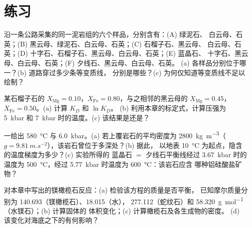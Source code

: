 \section{练习}

\begin{exercise}[$\star$]\label{exo:b2:pt-paths:1}
沿一条公路采集的同一泥岩组的六个样品，分别含有：(A) 绿泥石、
白云母、石英；(B) 黑云母、绿泥石、白云母、石英；(C) 石榴子石、黑云母、
白云母、石英；(D) 十字石、石榴子石、黑云母、白云母、石英；(E) 蓝晶石、
十字石、黑云母、白云母、石英；(F) 夕线石、黑云母、白云母、石英。
(a) 各样品分别位于哪一？(b) 道路穿过多少条等变质线，
分别是哪些？(c) 为何仅知道等变质线不足以
绘制？
\end{exercise}

\begin{exercise}[$\star$]\label{exo:b2:pt-paths:2}
某石榴子石的 $X_{\text{Mg}} = 0.10$，$X_{\text{Fe}} = 0.80$，与之相邻的黑云母的
$X_{\text{Mg}} = 0.45$，$X_{\text{Fe}} = 0.50$。(a) 计算 $K_D$ 和 $\ln K_D$。
(b) 利用本章的标定式，计算压强为 \qty{5}{kbar} 和
\qty{7}{kbar} 时的温度。(c) 该结果是还是？
\end{exercise}

\begin{exercise}[$\star$]\label{exo:b2:pt-paths:3}
一给出 \qty{580}{\celsius} 与 \qty{6.0}{kbar}。(a) 若上覆岩石的平均密度为
\qty{2800}{kg.m^{-3}}（$g = \qty{9.81}{m.s^{-2}}$），该岩石曾位于多深处？(b) 据此，
以地表 \qty{10}{\celsius} 为起点，隐含的温度梯度为多少？(c) 实验所得的
蓝晶石 $=$ 夕线石平衡线经过 \qty{3.67}{kbar} 时的温度为
\qty{500}{\celsius}，经过 \qty{5.77}{kbar} 时温度为 \qty{600}{\celsius}：该岩石应含
哪种铝硅酸盐矿物？
\end{exercise}

\begin{exercise}[$\star$]\label{exo:b2:pt-paths:4}
对本章中写出的镁橄榄石反应：(a) 检验该方程的质量是否平衡，
已知摩尔质量分别为 140.693（镁橄榄石）、18.015（水），
277.112（蛇纹石）和 \qty{58.320}{g.mol^{-1}}（水镁石）；(b) 计算固体的
体积变化；(c) 计算橄榄石及各生成物的密度。
(d) 该变化对海底之下的有何影响？
\end{exercise}

